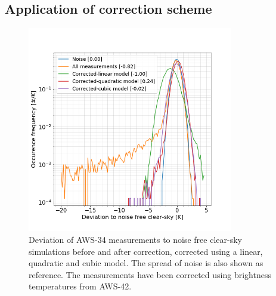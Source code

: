 \documentclass[12pt]{article}
\begin{document}


\subsection{Application of correction scheme}
\begin{figure}[!p]
	\centering
	\includegraphics[clip,trim=0 0 0 0,height=90mm]{PDF_corrected_AWS-34_AWS-42}
	\caption{Deviation of AWS-34 measurements to noise free clear-sky
      simulations before and after correction, corrected using a linear,
      quadratic and cubic model. The spread of noise is also shown as
      reference. The measurements have been corrected using brightness
      temperatures from AWS-42. }
	\label{fig:correction:c34-42}
\end{figure}
%
\end{document}
